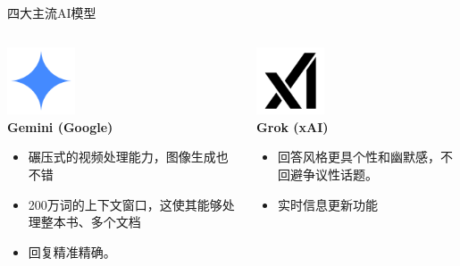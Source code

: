 \documentclass{beamer}
\begin{document}
\begin{frame}{四大主流AI模型}
    \begin{columns}[T]
        \begin{column}{0.5\textwidth}
            \begin{center}
                \includegraphics[height=2cm]{assets/gemini-ai.png} \\
                \large\textbf{Gemini (Google)}
            \end{center}
            \begin{itemize}
                \item 碾压式的视频处理能力，图像生成也不错
                \item 200万词的上下文窗口，这使其能够处理整本书、多个文档
                \item 回复精准精确。
            \end{itemize}
        \end{column}
        
        \begin{column}{0.5\textwidth}
            \begin{center}
                \includegraphics[height=2cm]{assets/Grok.png} \\
                \large\textbf{Grok (xAI)}
            \end{center}
            \begin{itemize}
                \item 回答风格更具个性和幽默感，不回避争议性话题。
                \item 实时信息更新功能
            \end{itemize}
        \end{column}
    \end{columns}
\end{frame}
\end{document}
